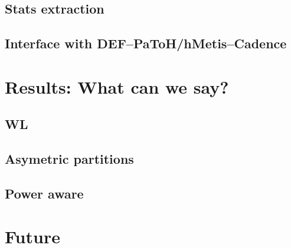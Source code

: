 \documentclass[11pt,a4paper]{article}
\theoremstyle{customdef}
\begin{document}
\subsection{Stats extraction}

\subsection{Interface with DEF--PaToH/hMetis--Cadence}





\section{Results: What can we say?}
\subsection{WL}
\subsection{Asymetric partitions}
\subsection{Power aware}






\section{Future}
\end{document}
